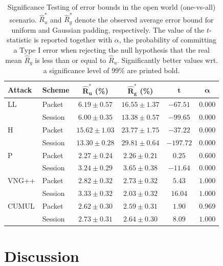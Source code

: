 \documentclass[
	ruledheaders=chapter,
	class=report,
	thesis={type=master, department=inf},
	accentcolor=1c,
	custommargins=true,
	marginpar=false,
	parskip=half-,
	fontsize=11pt,
]{tudapub}
\begin{document}
	\begin{table}
		\centering
		\small
		\begin{tabular}{llcccc}
			\toprule \textbf{Attack} & \textbf{Scheme} & $\mathbf{\widehat{R}^*_u}$ \textbf{(\%)} & $\mathbf{\widehat{R}^*_g}$  \textbf{(\%)} & $\mathbf{t}$ & $\mathbf{\alpha}$ \\
			\midrule LL & Packet & $6.19 \pm 0.57$ & $\mathbf{16.55 \pm 1.37}$ & $-67.51$ & $0.000$\\
			& Session & $6.00 \pm 0.35$ & $\mathbf{13.38 \pm 0.57}$ & $-99.65$ &  $0.000$\\ \addlinespace
			H & Packet & $15.62 \pm 1.03$ & $\mathbf{23.77 \pm 1.75}$ & $-37.22$ & $0.000$ \\
			& Session & $13.30 \pm 0.28$ & $\mathbf{29.81 \pm 0.64}$ & $-197.72$ & $0.000$ \\ \addlinespace
			P & Packet & $2.27 \pm 0.24$ & $2.26 \pm 0.21$ & $0.25$ & $0.600$ \\
			& Session & $3.24 \pm 0.29$ & $\mathbf{3.65 \pm 0.38}$ & $-11.64$ & $0.000$ \\ \addlinespace
			VNG++ & Packet & $\mathbf{2.82 \pm 0.32}$ & $2.73 \pm 0.32$ & $5.43$ & $1.000$ \\
			& Session & $\mathbf{3.33 \pm 0.32}$ & $2.03 \pm 0.32$ & $16.04$ & $1.000$ \\ \addlinespace
			CUMUL & Packet & $2.62\pm 0.30$ & $2.59 \pm 0.31$ & $1.90$ & $0.969$\\
			& Session & $\mathbf{2.73 \pm 0.31}$ & $2.64 \pm 0.30$ & $8.09$ & $1.000$ \\
			\bottomrule
		\end{tabular}
		\caption[Significance Testing of error bounds in the open world scenario]{Significance Testing of error bounds in the open world (one-vs-all) scenario. $\widehat{R}^*_u$ and $\widehat{R}^*_g$ denote the observed average error bound for uniform and Gaussian padding, respectively. The value of the $t$-statistic is reported together with $\alpha$, the probability of committing a Type I error when rejecting the null hypothesis that the real mean $\widehat{R}_g$ is less than or equal to $\widehat{R}_u$. Significantly better values wrt. a significance level of 99\% are printed bold. }
		\label{tbl:sig_bound_ow}
	\end{table}

	\chapter{Discussion}
	\label{discussion}
\end{document}
